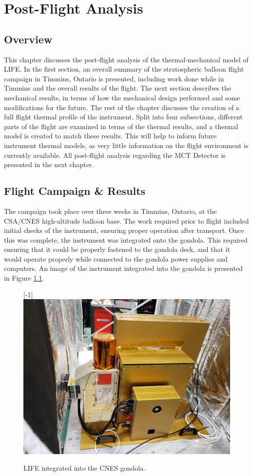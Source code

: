 \chapter{Post-Flight Analysis} \label{postflight}

\section{Overview}
This chapter discusses the post-flight analysis of the thermal-mechanical model of LIFE. In the first section, an overall summary of the stratospheric balloon flight campaign in Timmins, Ontario is presented, including work done while in Timmins and the overall results of the flight. The next section describes the mechanical results, in terms of how the mechanical design performed and some modifications for the future. The rest of the chapter discusses the creation of a full flight thermal profile of the instrument. Split into four subsections, different parts of the flight are examined in terms of the thermal results, and a thermal model is created to match these results. This will help to inform future instrument thermal models, as very little information on the flight environment is currently available. All post-flight analysis regarding the MCT Detector is presented in the next chapter.

\section{Flight Campaign \& Results}
The campaign took place over three weeks in Timmins, Ontario, at the CSA/CNES high-altitude balloon base. The work required prior to flight included initial checks of the instrument, ensuring proper operation after transport. Once this was complete, the instrument was integrated onto the gondola. This required ensuring that it could be properly fastened to the gondola deck, and that it would operate properly while connected to the gondola power supplies and computers. An image of the instrument integrated into the gondola is presented in Figure \ref{fig:LIFE_ON_GONDOLA}.

\begin{figure}
    \centering
    \scalebox{1}[-1]{\includegraphics[width=0.7\linewidth]{chap4_images/LIFE_on_gondola.jpg}}
    \caption{LIFE integrated into the CNES gondola.}
    \label{fig:LIFE_ON_GONDOLA}
\end{figure}


